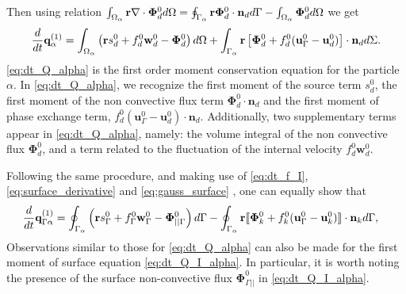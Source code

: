 \documentclass[11pt]{My_preprint}
\begin{document}
Then using relation $\int_{\Omega_{\alpha}} \textbf{r}  \mathbf{\nabla}\cdot \bm\Phi_d^0  d\Omega
= \oint_{\Gamma_{\alpha}}  \textbf{r} \bm\Phi_d^0 \cdot \textbf{n}_d  d\Gamma
- \int_{\Omega_{\alpha}}  \bm\Phi_d^0  d\Omega$ we get
\begin{align}
    \frac{d}{dt} \textbf{q}^{(1)}_\alpha
= \intO{\left( 
        \textbf{r} s_d^0  
        + f_d^0  \textbf{w}_d^0
        - \bm\Phi_d^0
    \right) }
    + \int_{\Gamma_\alpha} \textbf{r} \left[
        \bm\Phi_d^0
        + f_d^0 (\textbf{u}_\Gamma^0-\textbf{u}_d^0)
    \right]\cdot \textbf{n}_d  d\Sigma.
    \label{eq:dt_Q_alpha}
\end{align}
 \ref{eq:dt_Q_alpha} is the first order moment conservation equation for the particle $\alpha$. 
 In \ref{eq:dt_Q_alpha}, we recognize the first moment of the source term $s_d^0$, the first moment of the non convective flux term $\bm\Phi_d^0\cdot\textbf{n}_d$ and the first moment of phase exchange term, $f_d^0 (\textbf{u}_\Gamma^0-\textbf{u}_d^0)\cdot\textbf{n}_d$. 
 Additionally, two supplementary terms appear in \ref{eq:dt_Q_alpha}, namely: the volume integral of the non convective flux $\bm\Phi_d^0$, and a term related to the fluctuation of the internal velocity $f_d^0 \textbf{w}_d^0$.

Following the same procedure, and making use of \ref{eq:dt_f_I}, \ref{eq:surface_derivative} and \ref{eq:gauss_surface} , one can equally show that 
\begin{align}
    \ddt {\textbf{q}^{(1)}_{\Gamma\alpha}}
    &= \intS{ \left(
        \textbf{r}s_\Gamma^0
        + f_\Gamma^0 \textbf{w}_\Gamma^0
        - \mathbf{\Phi}_{||\Gamma}^0
    \right) }
    - \intS{\textbf{r} 
    \Jump{\mathbf{\Phi}_k^0
        + f_k^0 (\textbf{u}_\Gamma^0 - \textbf{u}_k^0)
    }
    },
    \label{eq:dt_Q_I_alpha}
\end{align}
Observations similar to those for \ref{eq:dt_Q_alpha} can also be made for the first moment of surface equation \ref{eq:dt_Q_I_alpha}.
In particular, it is worth noting the presence of the surface non-convective flux $\mathbf{\Phi}_{\Gamma||}^0$ in \ref{eq:dt_Q_I_alpha}.
\end{document}
